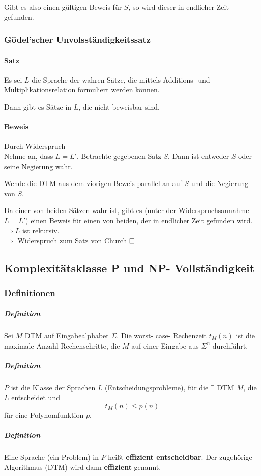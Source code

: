 \documentclass[fleqn]{scrartcl}
\begin{document}
Gibt es also einen gültigen Beweis für $S$, so wird dieser in endlicher Zeit gefunden.

\subsubsection{Gödel'scher Unvolsständigkeitssatz}
\paragraph{Satz} Es sei $L$ die Sprache der wahren Sätze, die mittels Additions- und Multiplikationsrelation formuliert werden können.

Dann gibt es Sätze in $L$, die nicht beweisbar sind.

\paragraph{Beweis} Durch Widerspruch\\
Nehme an, dass $L = L'$. Betrachte gegebenen Satz $S$. Dann ist entweder $S$ oder seine Negierung wahr.

Wende die DTM aus dem viorigen Beweis parallel an auf $S$ und die Negierung von $S$.

Da einer von beiden Sätzen wahr ist, gibt es (unter der Widerspruchsannahme $L = L'$) einen Beweis für einen von beiden, der in endlicher Zeit gefunden wird.\\
$\Rightarrow L$ ist rekursiv.\\
$\Rightarrow$ Widerspruch zum Satz von Church $\hfill \square$

\subsection{Komplexitätsklasse P und NP- Vollständigkeit}
\subsubsection{Definitionen}
\subparagraph{Definition} Sei $M$ DTM auf Eingabealphabet $\Sigma$. Die worst- case- Rechenzeit $t_M(n)$ ist die maximale Anzahl Rechenschritte, die $M$ auf einer Eingabe aus $\Sigma^n$ durchführt.
\subparagraph{Definition} $P$ ist  die Klasse der Sprachen $L$ (Entscheidungsprobleme), für die $\exists $ DTM $M$, die $L$ entscheidet und
\[t_M(n) \leq p(n)\]
für eine Polynomfunktion $p$.
\subparagraph{Definition} Eine Sprache (ein Problem) in $P$ heißt \textbf{effizient entscheidbar}. Der zugehörige Algorithmus (DTM) wird dann \textbf{effizient} genannt.
\end{document}
